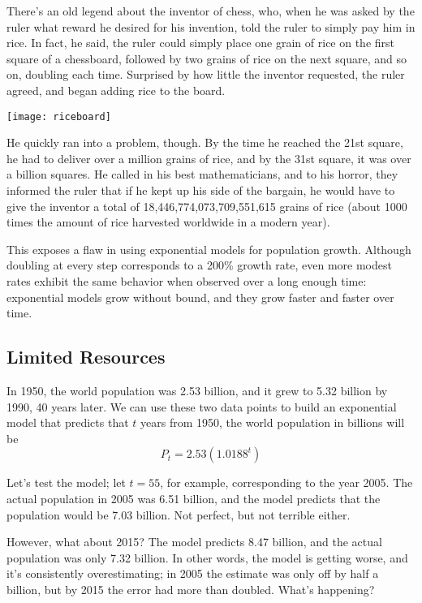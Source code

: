 \setcounter{ExampleCounter}{1}
There's an old legend about the inventor of chess, who, when he was asked by the ruler what reward he desired for his invention, told the ruler to simply pay him in rice.  In fact, he said, the ruler could simply place one grain of rice on the first square of a chessboard, followed by two grains of rice on the next square, and so on, doubling each time.  Surprised by how little the inventor requested, the ruler agreed, and began adding rice to the board.

\begin{center}
\texttt{[image: riceboard]}
\end{center}

He quickly ran into a problem, though.  By the time he reached the 21st square, he had to deliver over a million grains of rice, and by the 31st square, it was over a billion squares.  He called in his best mathematicians, and to his horror, they informed the ruler that if he kept up his side of the bargain, he would have to give the inventor a total of 18,446,774,073,709,551,615 grains of rice (about 1000 times the amount of rice harvested worldwide in a modern year).

This exposes a flaw in using exponential models for population growth.  Although doubling at every step corresponds to a 200\% growth rate, even more modest rates exhibit the same behavior when observed over a long enough time: exponential models grow without bound, and they grow faster and faster over time.

\subsection{Limited Resources}
In 1950, the world population was 2.53 billion, and it grew to 5.32 billion by 1990, 40 years later.  We can use these two data points to build an exponential model that predicts that $t$ years from 1950, the world population in billions will be \[P_t = 2.53(1.0188^t)\]

Let's test the model; let $t=55$, for example, corresponding to the year 2005.  The actual population in 2005 was 6.51 billion, and the model predicts that the population would be 7.03 billion.  Not perfect, but not terrible either.

However, what about 2015?  The model predicts 8.47 billion, and the actual population was only 7.32 billion.  In other words, the model is getting worse, and it's consistently overestimating; in 2005 the estimate was only off by half a billion, but by 2015 the error had more than doubled.  What's happening?

